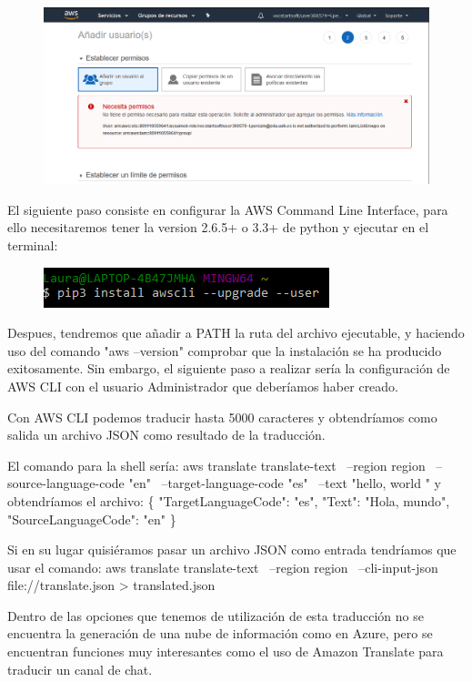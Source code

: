 \documentclass[runningheads]{llncs}
\begin{document}
\begin{figure}[H]
\centering
\includegraphics[scale=0.5]{./IA/AWS/denyedpermissionAWS.png}
\end{figure}

El siguiente paso consiste en configurar la AWS Command Line Interface, para  ello necesitaremos tener la version 2.6.5+ o 3.3+ de python y ejecutar en el terminal:

\begin{figure}[H]
\centering
\includegraphics[scale=0.5]{./IA/AWS/pipAWS.png}
\end{figure}

Despues, tendremos que añadir a PATH la ruta del archivo ejecutable, y haciendo uso del comando "aws --version" comprobar que la instalación se ha producido exitosamente. Sin embargo, el siguiente paso a realizar sería la configuración de AWS CLI con el usuario Administrador que deberíamos haber creado.

Con AWS CLI podemos traducir hasta 5000 caracteres y obtendríamos como salida un archivo JSON como resultado de la traducción.

El comando para la shell sería:
aws translate translate-text \
            --region region \
            --source-language-code "en" \
            --target-language-code "es" \
            --text "hello, world " 
y obtendríamos el archivo:
\{
    "TargetLanguageCode": "es",
    "Text": "Hola, mundo",
    "SourceLanguageCode": "en"
\}

Si en su lugar quisiéramos pasar un archivo JSON como entrada tendríamos que usar el comando:
aws translate translate-text \
            --region region \
            --cli-input-json file://translate.json > translated.json

Dentro de las opciones que tenemos de utilización de esta traducción no se encuentra la generación de una nube de información como en Azure, pero se encuentran funciones muy interesantes como el uso de Amazon Translate para traducir un canal de chat.
\end{document}
